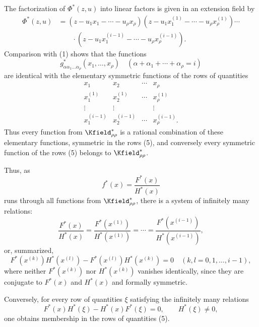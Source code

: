 \documentclass[11pt]{article}
\begin{document}
The factorization of $\Phi^*(z,u)$ into linear factors is given in an extension field by
\begin{equation}
\begin{aligned}
 \Phi^*(z,u)&=(z-u_1x_1-\cdots-u_\rho x_\rho)
 (z-u_1x_1^{(1)}-\cdots-u_\rho x_\rho^{(1)})\cdots\\
 &\qquad\cdot
 (z-u_1x_1^{(i-1)}-\cdots-u_\rho x_\rho^{(i-1)}).
\end{aligned}
\tag{4}
\end{equation}
Comparison with (1) shows that the functions
\[
  g^*_{\alpha\alpha_1\ldots\alpha_\rho}(x_1,
  \ldots,x_\rho)\quad(\alpha+\alpha_1+\cdots+\alpha_\rho=i)
\]
are identical with the elementary symmetric functions of the rows of quantities
\begin{equation}
\begin{array}{cccc}
  x_1 & x_2 & \cdots & x_\rho\\
  x_1^{(1)} & x_2^{(1)} & \cdots & x_\rho^{(1)}\\
  \vdots & \vdots & & \vdots\\
  x_1^{(i-1)} & x_2^{(i-1)} & \cdots & x_\rho^{(i-1)}.
\end{array}
\tag{5}
\end{equation}
Thus every function from $\Kfield^*_{\rho\rho}$ is a rational combination of these elementary functions, symmetric in the rows (5), and conversely every symmetric function of the rows (5) belongs to $\Kfield^*_{\rho\rho}$.

Thus, as
\[
  f^*(x)=\frac{F^*(x)}{H^*(x)}
\]
runs through all functions from $\Kfield^*_{\rho\rho}$, there is a system of infinitely many relations:
\begin{equation}
  \frac{F^*(x)}{H^*(x)}=
  \frac{F^*(x^{(1)})}{H^*(x^{(1)})}=\cdots=
  \frac{F^*(x^{(i-1)})}{H^*(x^{(i-1)})},
\tag{6}
\end{equation}
or, summarized,
\[
  F^*(x^{(k)})H^*(x^{(l)})-
  F^*(x^{(l)})H^*(x^{(k)})=0
  \quad(k,l=0,1,\ldots,i-1),
\]
where neither $F^*(x^{(k)})$ nor $H^*(x^{(k)})$ vanishes identically, since they are conjugate to $F^*(x)$ and $H^*(x)$ and formally symmetric.

Conversely, for every row of quantities $\xi$ satisfying the infinitely many relations
\begin{equation}
  F^*(x)H^*(\xi)-H^*(x)F^*(\xi)=0,
  \qquad H^*(\xi)\ne0,
\tag{7}
\end{equation}
one obtains membership in the rows of quantities (5).
\end{document}

